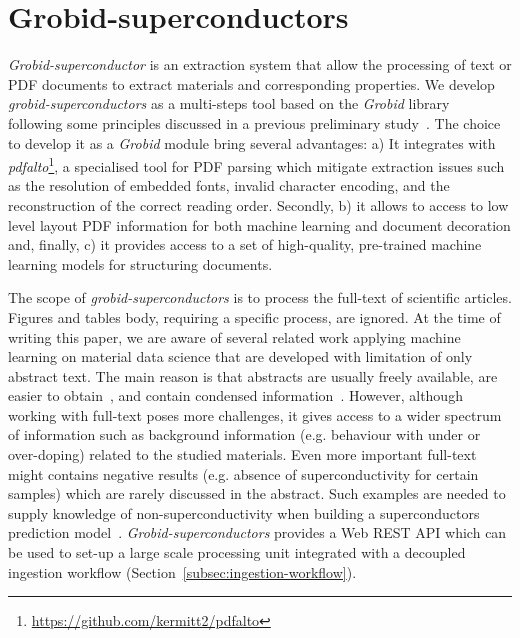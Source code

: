 \documentclass{article}
\begin{document}
\section{Grobid-superconductors}

\textit{Grobid-superconductor} is an extraction system that allow the processing of text or PDF documents to extract materials and corresponding properties. 
We develop \textit{grobid-superconductors} as a multi-steps tool based on the \textit{Grobid} library~\cite{GROBID} following some principles discussed in a previous preliminary study~\cite{foppiano:hal-02870896}.  
The choice to develop it as a \textit{Grobid} module bring several advantages: a) It integrates with \textit{pdfalto}\footnote{\url{https://github.com/kermitt2/pdfalto}}, a specialised tool for PDF parsing which mitigate extraction issues such as the resolution of embedded fonts, invalid character encoding, and the reconstruction of the correct reading order. 
Secondly, b) it allows to access to low level layout PDF information for both machine learning and document decoration and, finally, c) it provides access to a set of high-quality, pre-trained machine learning models for structuring documents.

The scope of \textit{grobid-superconductors} is to process the full-text of scientific articles. Figures and tables body, requiring a specific process, are ignored.
At the time of writing this paper, we are aware of several related work applying machine learning on material data science that are developed with limitation of  only abstract text.
The main reason is that abstracts are usually freely available, are easier to obtain~\cite{kononova_text-mined_2019}, and contain condensed information~\cite{yamaguchi-etal-2020-sc, court_magnetic_2020}. 
However, although working with full-text poses more challenges, it gives access to a wider spectrum of information such as background information (e.g. behaviour with under or over-doping) related to the studied materials. Even more important full-text might contains negative results (e.g. absence of superconductivity for certain samples) which are rarely discussed in the abstract. 
Such examples are needed to supply knowledge of non-superconductivity when building a superconductors prediction model~\cite{stanev_machine_2017}. 
\textit{Grobid-superconductors} provides a Web REST API which can be used to set-up a large scale processing unit integrated with a decoupled ingestion workflow (Section~\ref{subsec:ingestion-workflow}).
\end{document}
